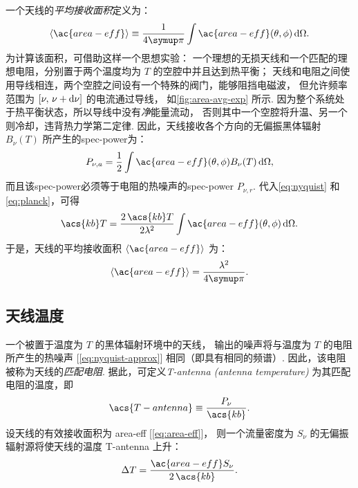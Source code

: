 一个天线的\emph{平均接收面积}定义为：
\begin{equation}
  \label{eq:area-avg1}
  \langle \ac{area-eff} \rangle
    \equiv \frac{1}{4\Cpi} \int \ac{area-eff}(\theta,\phi) \,\D{\Omega} .
\end{equation}
为计算该面积，可借助这样一个思想实验：
一个理想的无损天线和一个匹配的理想电阻，分别置于两个温度均为 $T$ 的空腔中并且达到热平衡；
天线和电阻之间使用导线相连，两个空腔之间设有一个特殊的阀门，能够阻挡电磁波，
但允许频率范围为 $[\nu, \,\nu+\mathrm{d}\nu]$ 的电流通过导线，
如\autoref{fig:area-avg-exp} 所示.
因为整个系统处于热平衡状态，所以导线中没有\emph{净}能量流动，
否则其中一个空腔将升温、另一个则冷却，违背热力学第二定律.
因此，天线接收各个方向的无偏振黑体辐射 $B_{\nu}(T)$ 所产生的\ac{spec-power}为：
\begin{equation}
  P_{\nu,a} =
    \frac{1}{2} \int \ac{area-eff}(\theta,\phi) B_{\nu}(T) \,\D{\Omega} ,
\end{equation}
而且该\ac{spec-power}必须等于电阻的热噪声的\ac{spec-power} $P_{\nu,r}$.
代入\autoref{eq:nyquist} 和\autoref{eq:planck}，可得
\begin{equation}
  \acs{kb}T =
    \frac{2\,\acs{kb}T}{2\lambda^2}
      \int \ac{area-eff}(\theta,\phi) \,\D{\Omega} .
\end{equation}
于是，天线的平均接收面积 $\langle \ac{area-eff} \rangle$ 为：
\begin{equation}
  \label{eq:area-avg}
  \langle \ac{area-eff} \rangle = \frac{\lambda^2}{4\Cpi}.
\end{equation}

\subsection{天线温度}

一个被置于温度为 $T$ 的黑体辐射环境中的天线，
输出的噪声将与温度为 $T$ 的电阻所产生的热噪声 [\autoref{eq:nyquist-approx}]
相同（即具有相同的频谱）.
因此，该电阻被称为天线的\emph{匹配电阻}.
据此，可定义\emph{\acl{T-antenna} (antenna temperature)} 为其匹配电阻的温度，即
\begin{equation}
  \label{eq:t-ant}
  \acs{T-antenna} \equiv \frac{P_{\nu}}{\acs{kb}} .
\end{equation}
设天线的有效接收面积为 \ac{area-eff} [\autoref{eq:area-eff}]，
则一个流量密度为 $S_{\nu}$ 的无偏振辐射源将使天线的温度 \acs{T-antenna} 上升：
\begin{equation}
  \label{eq:dt-source}
  \Delta T = \frac{\ac{area-eff} S_{\nu}}{2\,\acs{kb}} .
\end{equation}


